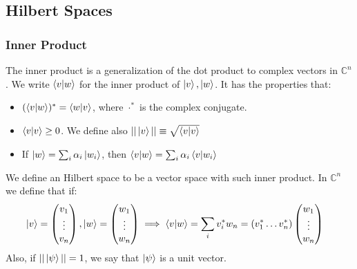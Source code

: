 \documentclass{beamer}
\begin{document}
    \subsection{Hilbert Spaces}
    \begin{frame}
        \frametitle{Inner Product}
        The inner product is a generalization of the dot product to complex vectors in $\mathbb{C}^n$.
        We write $\braket{v|w}$ for the inner product of $\ket{v}, \ket{w}$.
        It has the properties that:
        \begin{itemize}
            \item $(\braket{v|w})^* = \braket{w|v}$, where $\cdot^*$ is the complex conjugate.
            \item $\braket{v|v} \geq 0$. We define also $||\ket{v}|| \equiv \sqrt{\braket{v|v}}$
            \item If $\ket{w} = \sum_i \alpha_i \ket{w_i}$, then $\braket{v|w} = \sum_i \alpha_i \braket{v | w_i}$
        \end{itemize}
        We define an Hilbert space to be a vector space with such inner product.
        In $\mathbb{C}^n$ we define that if:
        \begin{align}
            \ket{v} &= \begin{pmatrix}
                v_1 \\
                \vdots \\
                v_n
            \end{pmatrix},
            \ket{w} = \begin{pmatrix}
                w_1 \\
                \vdots \\
                w_n
            \end{pmatrix} \implies
            \braket{v|w} = \sum_i v_i^* w_n = (v_1^* \dots v_n^*)\begin{pmatrix}
                w_1 \\
                \vdots \\
                w_n
            \end{pmatrix} 
        \end{align}
        Also, if $|| \ket{\psi} || = 1$, we say that $\ket{\psi}$ is a unit vector.
    \end{frame}
\end{document}
